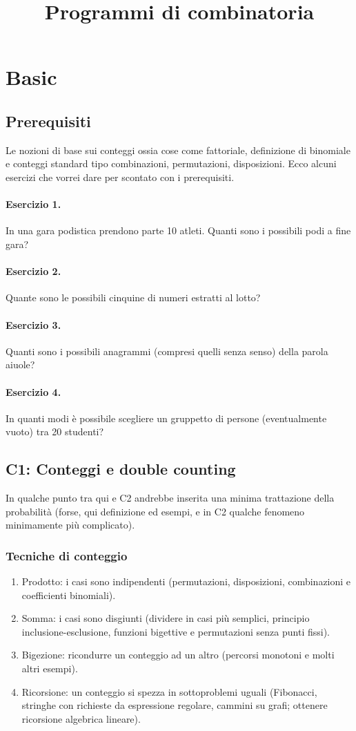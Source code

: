 \documentclass[a4paper,10pt]{article}
\title{Programmi di combinatoria}
\author{}
\begin{document}
\maketitle

\section{Basic}
\subsection{Prerequisiti}
Le nozioni di base sui conteggi ossia cose come fattoriale, definizione di binomiale e conteggi standard tipo combinazioni, permutazioni, disposizioni. Ecco alcuni esercizi che vorrei dare per scontato con i prerequisiti.
\paragraph{Esercizio 1.} In una gara podistica prendono parte 10 atleti. Quanti sono i possibili podi a fine gara?
\paragraph{Esercizio 2.} Quante sono le possibili cinquine di numeri estratti al lotto?
\paragraph{Esercizio 3.} Quanti sono i possibili anagrammi (compresi quelli senza senso) della parola aiuole?
\paragraph{Esercizio 4.} In quanti modi è possibile scegliere un gruppetto di persone
(eventualmente vuoto) tra 20 studenti?


\subsection{C1: Conteggi e double counting}
In qualche punto tra qui e C2 andrebbe inserita una minima trattazione della probabilità (forse, qui definizione ed esempi, e in C2 qualche fenomeno minimamente più complicato).

\subsubsection{Tecniche di conteggio}
\begin{enumerate}
	\item Prodotto: i casi sono indipendenti (permutazioni, disposizioni, combinazioni e coefficienti binomiali).
	\item Somma: i casi sono disgiunti (dividere in casi più semplici, principio inclusione-esclusione, funzioni bigettive e permutazioni senza punti fissi).
	\item Bigezione: ricondurre un conteggio ad un altro (percorsi monotoni e molti altri esempi).
	\item Ricorsione: un conteggio si spezza in sottoproblemi uguali (Fibonacci, stringhe con richieste da espressione regolare, cammini su grafi; ottenere ricorsione algebrica lineare).
\end{enumerate}
\end{document}
